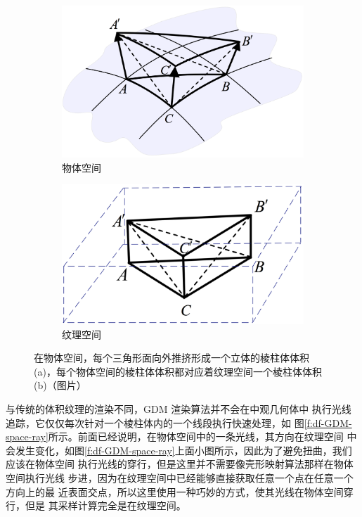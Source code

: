 \begin{figure}
	\begin{subfigure}[b]{0.49\textwidth}
		\includegraphics[width=\textwidth]{figures/df/GDM-object-space}
		\caption{物体空间}
	\end{subfigure}
	\begin{subfigure}[b]{0.51\textwidth}
		\includegraphics[width=\textwidth]{figures/df/GDM-texture-space}
		\caption{纹理空间}
	\end{subfigure}
	\caption{在物体空间，每个三角形面向外推挤形成一个立体的棱柱体体积 (a)，每个物体空间的棱柱体体积都对应着纹理空间一个棱柱体体积 (b)（图片\cite{a:GeneralizedDisplacementMaps}）}
	\label{f:df-GDM-space}
\end{figure}

与传统的体积纹理的渲染不同，GDM 渲染算法并不会在中观几何体中 执行光线追踪，它仅仅每次针对一个棱柱体内的一个线段执行快速处理，如 图\ref{f:df-GDM-space-ray}所示。前面已经说明，在物体空间中的一条光线，其方向在纹理空间 中会发生变化，如图\ref{f:df-GDM-space-ray}上面小图所示，因此为了避免扭曲，我们应该在物体空间 执行光线的穿行，但是这里并不需要像壳形映射算法那样在物体空间执行光线 步进，因为在纹理空间中已经能够直接获取任意一个点在任意一个方向上的最 近表面交点，所以这里使用一种巧妙的方式，使其光线在物体空间穿行，但是 其采样计算完全是在纹理空间。

